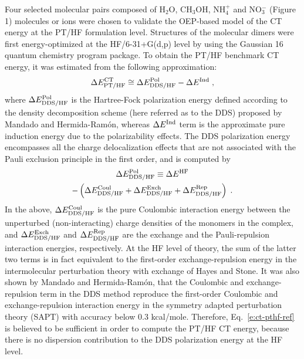 Four selected molecular pairs composed of H$_2$O, CH$_3$OH, NH$_4^+$ and NO$_3^-$
(Figure 1) molecules or ions were chosen to validate the OEP\hyp{}based model of the CT energy
at the PT/HF formulation level. Structures of the molecular dimers were first 
energy\hyp{}optimized at the HF/6-31+G(d,p) level by using
the Gaussian 16 quantum chemistry program package.\cite{Gaussian16}
To obtain the PT/HF benchmark CT energy, it was estimated
from the following approximation:
%
\begin{equation}\label{e:ct-pthf-ref}
 \Delta E^{\rm CT}_{\rm PT/HF} \cong \Delta E^{\rm Pol}_{\rm DDS/HF} 
 - \Delta E^{\rm Ind} \;,
\end{equation}
%
where $\Delta E^{\rm Pol}_{\rm DDS/HF}$ is the Hartree\hyp{}Fock polarization energy
defined
according to the density decomposition scheme (here referred as to the DDS) 
proposed by Mandado and Hermida\hyp{}Ram{\'o}n,\cite{Mandado.Hermida-Ramon.JCTC.2011} 
whereas $\Delta E^{\rm Ind}$ term is the 
approximate pure induction energy due to the polarizability effects.\cite{Stone.TheTheoryOfIntermolecularForces.1996}
The DDS polarization energy encompasses all the charge delocalization
effects that are not associated with the Pauli exclusion principle
in the first order, and is computed by
%
\begin{multline}\label{e:de-pol-dds}
\Delta E^{\rm Pol}_{\rm DDS/HF} \equiv \Delta E^{\rm HF} \\
 - \left(
   \Delta E^{\rm Coul}_{\rm DDS/HF}
 + \Delta E^{\rm Exch}_{\rm DDS/HF}
 + \Delta E^{\rm Rep}_{\rm DDS/HF} 
   \right)\;.
\end{multline}
%
In the above, $\Delta E^{\rm Coul}_{\rm DDS/HF}$ is the pure Coulombic interaction energy
between the unperturbed (non\hyp{}interacting) charge densities of the monomers in the complex,
and
$\Delta E^{\rm Exch}_{\rm DDS/HF}$ and $\Delta E^{\rm Rep}_{\rm DDS/HF}$
are the exchange and the Pauli\hyp{}repulsion interaction energies, respectively. 
At the HF level of theory, the sum of the latter two terms is in fact
equivalent to the first\hyp{}order exchange\hyp{}repulsion energy 
in the intermolecular perturbation theory with exchange of Hayes and Stone.\cite{Hayes.Stone.MolPhys.1984} 
It was also shown by 
Mandado and Hermida\hyp{}Ram{\'o}n,\cite{Mandado.Hermida-Ramon.JCTC.2011}
that the Coulombic and exchange\hyp{}repulsion term
in the DDS method reproduce the first\hyp{}order Coulombic and exchange\hyp{}repulsion
interaction energy in the symmetry adapted perturbation theory\cite{Jeziorski.Moszynski.Szalewicz.ChemRev.1994}
(SAPT)
with accuracy below 0.3 kcal/mole.
Therefore, Eq.~\eqref{e:ct-pthf-ref} is believed to be sufficient
in order to compute the PT/HF CT energy, because there is no dispersion
contribution to the DDS polarization energy at the HF level.

